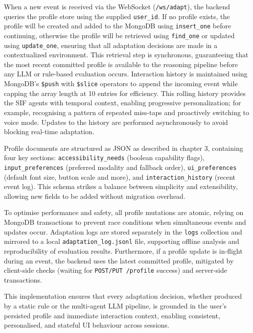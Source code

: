 \documentclass[openany]{book}
\begin{document}
When a new event is received via the WebSocket (\texttt{/ws/adapt}), the backend queries the profile store using the supplied \texttt{user\_id}. If no profile exists, the profile will be created and added to the MongoDB using \texttt{insert\_one} before continuing, otherwise the profile will be retrieved using \texttt{find\_one} or updated using \texttt{update\_one}, ensuring that all adaptation decisions are made in a contextualized environment. This retrieval step is synchronous, guaranteeing that the most recent committed profile is available to the reasoning pipeline before any LLM or rule-based evaluation occurs. Interaction history is maintained using MongoDB’s \texttt{\$push} with \texttt{\$slice} operators to append the incoming event while capping the array length at 10 entries for efficiency. This rolling history provides the SIF agents with temporal context, enabling progressive personalization; for example, recognising a pattern of repeated miss-taps and proactively switching to voice mode. Updates to the history are performed asynchronously to avoid blocking real-time adaptation.

Profile documents are structured as JSON as described in chapter 3, containing four key sections: \texttt{accessibility\_needs} (boolean capability flags), \texttt{input\_preferences} (preferred modality and fallback order), \texttt{ui\_preferences} (default font size, button scale and more), and \texttt{interaction\_history} (recent event log). This schema strikes a balance between simplicity and extensibility, allowing new fields to be added without migration overhead.

To optimise performance and safety, all profile mutations are atomic, relying on MongoDB transactions to prevent race conditions when simultaneous events and updates occur. Adaptation logs are stored separately in the \texttt{logs} collection and mirrored to a local \texttt{adaptation\_log.jsonl} file, supporting offline analysis and reproducibility of evaluation results. Furthermore, if a profile update is in-flight during an event, the backend uses the latest committed profile, mitigated by client-side checks (waiting for \texttt{POST/PUT /profile} success) and server-side transactions.

This implementation ensures that every adaptation decision, whether produced by a static rule or the multi-agent LLM pipeline, is grounded in the user’s persisted profile and immediate interaction context, enabling consistent, personalised, and stateful UI behaviour across sessions.
\end{document}
